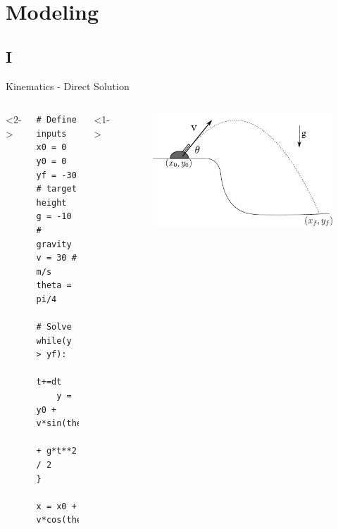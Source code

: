 \documentclass[compress, blue]{beamer}
\begin{document}


\section{Modeling}
\subsection{I}
\begin{frame}{Kinematics - Direct Solution}
\begin{columns}
    <2->

\begin{lstlisting}
# Define inputs
x0 = 0
y0 = 0
yf = -30 # target height 
g = -10 # gravity 
v = 30 # m/s
theta = pi/4

# Solve 
while(y > yf):
    t+=dt
    y = y0 + v*sin(theta)*t 
           + g*t**2 / 2
}

x = x0 + v*cos(theta)*t
\end{lstlisting}

    <1->
    \begin{figure}
        \includegraphics[width=\textwidth]{images/cannon.pdf}
    \end{figure}
\end{columns}
\end{frame}


\end{document}
